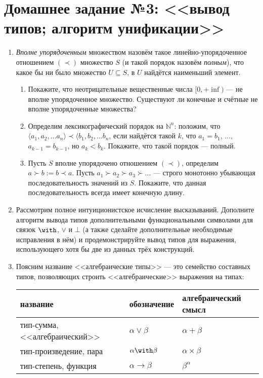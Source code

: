 \documentclass[10pt,a4paper,oneside]{article}
\begin{document}
\section*{Домашнее задание №3: <<вывод типов; алгоритм унификации>>}

\begin{enumerate}

\item \emph{Вполне упорядоченным} множеством назовём такое линейно-упорядоченное отношением $(\prec)$ 
множество $S$ (и такой порядок назовём \emph{полным}), 
что какое бы ни было множество $U \subseteq S$, в $U$ найдётся наименьший элемент.
\begin{enumerate}
\item Покажите, что неотрицательные вещественные числа $[0,+\inf)$ --- не вполне упорядоченное множество.
Существуют ли конечные и счётные не вполне упорядоченные множества?
\item Определим лексикографический порядок на $\mathbb{N}^n$: положим, что 
$\langle a_1, a_2, \dots a_n \rangle \prec \langle b_1, b_2, \dots b_n$, если найдётся такой $k$,
что $a_1 = b_1$, ..., $a_{k-1} = b_{k-1}$, но $a_k < b_k$.
Покажите, что такой порядок --- полный.
\item Пусть $S$ вполне упорядочено отношением $(\prec)$, 
определим $a\succ b := b \prec a$. Пусть $a_1 \succ a_2 \succ a_3 \succ \dots$ --- 
строго монотонно убывающая последовательность значений из $S$. Покажите, что данная 
последовательность всегда имеет конечную длину.
\end{enumerate}

\item Рассмотрим полное интуиционистское исчисление высказываний.
Дополните алгоритм вывода типов дополнительными функциональными символами 
для связок $\with$, $\vee$ и $\bot$ (а также сделайте дополнительные 
необходимые исправления в нём) и продемонстрируйте вывод типов для выражения,
использующего хотя бы две из данных трёх конструкций.

\item Поясним название <<алгебраические типы>> --- это семейство составных типов, 
позволяющих строить <<алгебраические>> выражения на типах:

\begin{tabular}{lll}
название & обозначение & алгебраический смысл\\\hline
тип-сумма, <<алгебраический>> & $\alpha\vee\beta$ & $\alpha+\beta$\\
тип-произведение, пара & $\alpha\with\beta$ & $\alpha\times\beta$\\
тип-степень, функция & $\alpha\to\beta$&$\beta^\alpha$
\end{tabular}


\end{enumerate}
\end{document}
